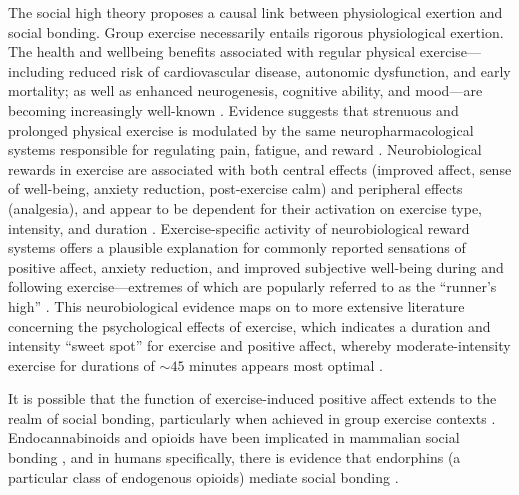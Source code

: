 \begin{CJK}{UTF8}{gbsn}
The social high theory proposes a causal link between physiological exertion and social bonding.  Group exercise necessarily entails rigorous physiological exertion.
The health and wellbeing benefits associated with regular physical exercise---including reduced risk of cardiovascular disease, autonomic dysfunction, and early mortality; as well as enhanced neurogenesis, cognitive ability, and mood---are becoming increasingly well-known \citep{Blair1994,Nagamatsu2014}. Evidence suggests that strenuous and prolonged physical exercise is modulated by the same neuropharmacological systems responsible for regulating pain, fatigue, and reward \citep{Boecker2008,Raichlen2013}.  Neurobiological rewards in exercise are associated with both central effects (improved affect, sense of well-being, anxiety reduction, post-exercise calm) and peripheral effects (analgesia), and appear to be dependent for their activation on exercise type, intensity, and duration \citep{Dietrich2004}.  Exercise-specific activity of neurobiological reward systems offers a plausible explanation for commonly reported sensations of positive affect, anxiety reduction, and improved subjective well-being during and following exercise---extremes of which are popularly referred to as the ``runner's high'' \citep{Dietrich2004,Boecker2008,Raichlen2012}.  This neurobiological evidence maps on to more extensive literature concerning the psychological effects of exercise, which indicates a duration and intensity ``sweet spot'' for exercise and positive affect, whereby moderate-intensity exercise for durations of $\sim45$ minutes appears most optimal \citep{Reed2006}.

It is possible that the function of exercise-induced positive affect extends to the realm of social bonding, particularly when achieved in group exercise contexts \citep{Cohen2009,Machin2011}.  Endocannabinoids and opioids have been implicated in mammalian social bonding \citep{Fattore2010,Keverne1989}, and in humans specifically, there is evidence that endorphins (a particular class of endogenous opioids) mediate social bonding \citep{Dunbar2012,Shultz2010}.


\end{CJK}
